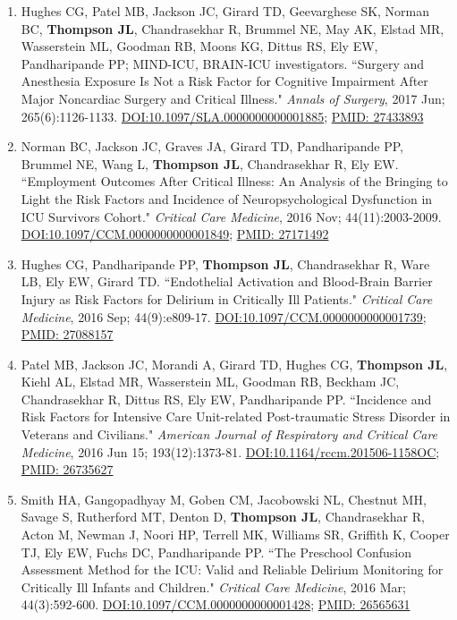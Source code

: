 \documentclass[5pt]{article}
\begin{document}
\begin{enumerate}
\item Hughes CG, Patel MB, Jackson JC, Girard TD, Geevarghese SK, Norman BC, \textbf{Thompson JL}, Chandrasekhar R, Brummel NE, May AK, Elstad MR, Wasserstein ML, Goodman RB, Moons KG, Dittus RS, Ely EW, Pandharipande PP; MIND-ICU, BRAIN-ICU investigators. ``Surgery and Anesthesia Exposure Is Not a Risk Factor for Cognitive Impairment After Major Noncardiac Surgery and Critical Illness." \emph{Annals of Surgery}, 2017 Jun; 265(6):1126-1133. \href{https://doi.org/10.1097/SLA.0000000000001885}{DOI:10.1097/SLA.0000000000001885}; \href{https://www.ncbi.nlm.nih.gov/pubmed/27433893/}{PMID: 27433893}
\item Norman BC, Jackson JC, Graves JA, Girard TD, Pandharipande PP, Brummel NE, Wang L, \textbf{Thompson JL}, Chandrasekhar R, Ely EW. ``Employment Outcomes After Critical Illness: An Analysis of the Bringing to Light the Risk Factors and Incidence of Neuropsychological Dysfunction in ICU Survivors Cohort." \emph{Critical Care Medicine}, 2016 Nov; 44(11):2003-2009. \href{https://doi.org/10.1097/CCM.0000000000001849}{DOI:10.1097/CCM.0000000000001849}; \href{https://www.ncbi.nlm.nih.gov/pubmed/27171492}{PMID: 27171492}
\item Hughes CG, Pandharipande PP, \textbf{Thompson JL}, Chandrasekhar R, Ware LB, Ely EW, Girard TD. ``Endothelial Activation and Blood-Brain Barrier Injury as Risk Factors for Delirium in Critically Ill Patients." \emph{Critical Care Medicine}, 2016 Sep; 44(9):e809-17. \href{https://doi.org/10.1097/CCM.0000000000001739}{DOI:10.1097/CCM.0000000000001739}; \href{https://www.ncbi.nlm.nih.gov/pubmed/27088157}{PMID: 27088157}
\item Patel MB, Jackson JC, Morandi A, Girard TD, Hughes CG, \textbf{Thompson JL}, Kiehl AL, Elstad MR, Wasserstein ML, Goodman RB, Beckham JC, Chandrasekhar R, Dittus RS, Ely EW, Pandharipande PP. ``Incidence and Risk Factors for Intensive Care Unit-related Post-traumatic Stress Disorder in Veterans and Civilians." \emph{American Journal of Respiratory and Critical Care Medicine}, 2016 Jun 15; 193(12):1373-81. \href{https://doi.org/10.1164/rccm.201506-1158OC}{DOI:10.1164/rccm.201506-1158OC}; \href{https://www.ncbi.nlm.nih.gov/pubmed/26735627}{PMID: 26735627}
\item Smith HA, Gangopadhyay M, Goben CM, Jacobowski NL, Chestnut MH, Savage S, Rutherford MT, Denton D, \textbf{Thompson JL}, Chandrasekhar R, Acton M, Newman J, Noori HP, Terrell MK, Williams SR, Griffith K, Cooper TJ, Ely EW, Fuchs DC, Pandharipande PP. ``The Preschool Confusion Assessment Method for the ICU: Valid and Reliable Delirium Monitoring for Critically Ill Infants and Children." \emph{Critical Care Medicine}, 2016 Mar; 44(3):592-600. \href{https://doi.org/10.1097/CCM.0000000000001428}{DOI:10.1097/CCM.0000000000001428}; \href{https://www.ncbi.nlm.nih.gov/pubmed/26565631}{PMID: 26565631}

\end{enumerate}
\end{document}
